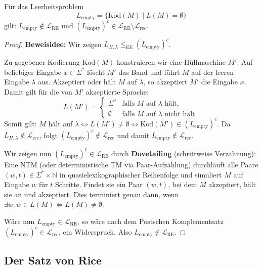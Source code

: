 \begin{theorem}
    Für das Leerheitsproblem
    \[
        L_{\mathrm{empty}} = \{\mathrm{Kod}(M) \mid L(M) = \emptyset\}
    \]
    gilt: $L_{\mathrm{empty}} \notin \mathcal{L}_{\mathrm{RE}}$ und $(L_{\mathrm{empty}})^c \in \mathcal{L}_{\mathrm{RE}} \setminus \mathcal{L}_{\mathrm{rec}}$.
\end{theorem}

\begin{proof}
    \textbf{Beweisidee:} Wir zeigen $L_{H,\lambda} \le_{\mathrm{EE}} (L_{\mathrm{empty}})^c$.
    
    Zu gegebener Kodierung $\mathrm{Kod}(M)$ konstruieren wir eine Hüllmaschine $M'$:
    Auf beliebiger Eingabe $x \in \Sigma^*$ löscht $M'$ das Band und führt $M$ auf der leeren Eingabe $\lambda$ aus. Akzeptiert oder hält $M$ auf $\lambda$, so akzeptiert $M'$ die Eingabe $x$.
    Damit gilt für die von $M'$ akzeptierte Sprache:
    \[
        L(M') = \begin{cases} \Sigma^* & \text{falls } M \text{ auf } \lambda \text{ hält}, \\ \emptyset & \text{falls } M \text{ auf } \lambda \text{ nicht hält}. \end{cases}
    \]
    Somit gilt: $M$ hält auf $\lambda \iff L(M') \neq \emptyset \iff \mathrm{Kod}(M') \in (L_{\mathrm{empty}})^c$.
    Da $L_{H,\lambda} \notin \mathcal{L}_{\mathrm{rec}}$, folgt $(L_{\mathrm{empty}})^c \notin \mathcal{L}_{\mathrm{rec}}$ und damit $L_{\mathrm{empty}} \notin \mathcal{L}_{\mathrm{rec}}$.
    
    Wir zeigen nun $(L_{\mathrm{empty}})^c \in \mathcal{L}_{\mathrm{RE}}$ durch \textbf{Dovetailing} (schrittweise Verzahnung):
    Eine NTM (oder deterministische TM via Paar-Aufzählung) durchläuft alle Paare $(w, t) \in \Sigma^* \times \mathbb{N}$ in quasielexikographischer Reihenfolge und simuliert $M$ auf Eingabe $w$ für $t$ Schritte. Findet sie ein Paar $(w, t)$, bei dem $M$ akzeptiert, hält sie an und akzeptiert. Dies terminiert genau dann, wenn $\exists w: w \in L(M) \iff L(M) \neq \emptyset$.
    
    Wäre nun $L_{\mathrm{empty}} \in \mathcal{L}_{\mathrm{RE}}$, so wäre nach dem Postschen Komplementsatz $(L_{\mathrm{empty}})^c \in \mathcal{L}_{\mathrm{rec}}$, ein Widerspruch. Also $L_{\mathrm{empty}} \notin \mathcal{L}_{\mathrm{RE}}$.
\end{proof}

\subsection{Der Satz von Rice}

